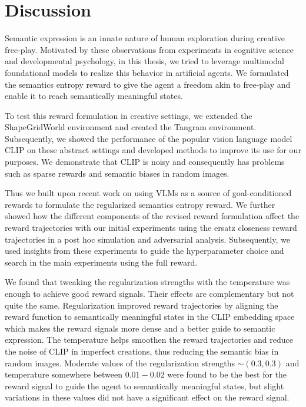 \chapter{Discussion}
\label{sec:discussion}

Semantic expression is an innate nature of human exploration during creative free-play.
Motivated by these observations from experiments in cognitive science and developmental psychology, in this thesis, we tried to leverage multimodal foundational models to realize this behavior in artificial agents.
We formulated the semantics entropy reward to give the agent a freedom akin to free-play and enable it to reach semantically meaningful states.

To test this reward formulation in creative settings, we extended the ShapeGridWorld environment and created the Tangram environment.
Subsequently, we showed the performance of the popular vision language model CLIP on these abstract settings and developed methods to improve its use for our purposes.
We demonstrate that CLIP is noisy and consequently has problems such as sparse rewards and semantic biases in random images.

Thus we built upon recent work on using VLMs as a source of goal-conditioned rewards to formulate the regularized semantics entropy reward.
We further showed how the different components of the revised reward formulation affect the reward trajectories with our initial experiments using the ersatz closeness reward trajectories in a post hoc simulation and adversarial analysis.
Subsequently, we used insights from these experiments to guide the hyperparameter choice and search in the main experiments using the full reward.

We found that tweaking the regularization strengths with the temperature was enough to achieve good reward signals.
Their effects are complementary but not quite the same.
Regularization improved reward trajectories by aligning the reward function to semantically meaningful states in the CLIP embedding space which makes the reward signals more dense and a better guide to semantic expression.
The temperature helps smoothen the reward trajectories and reduce the noise of CLIP in imperfect creations, thus reducing the semantic bias in random images.
Moderate values of the regularization strengths \(\sim (0.3, 0.3)\) and temperature somewhere between \(0.01 - 0.02\)  were found to be the best for the reward signal to guide the agent to semantically meaningful states, but slight variations in these values did not have a significant effect on the reward signal.

